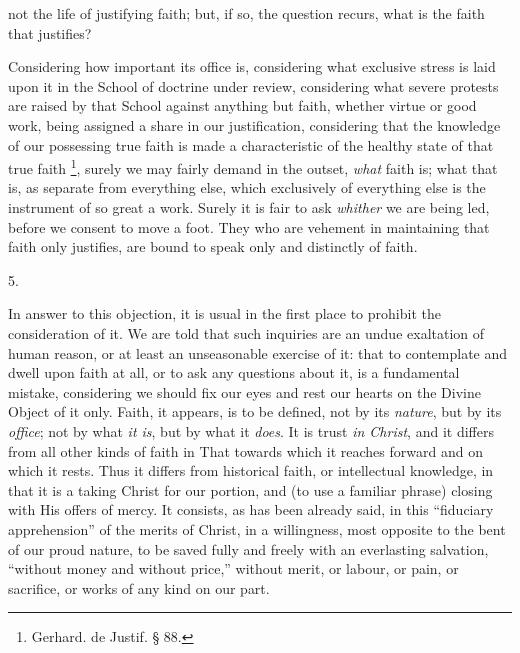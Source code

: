 not the life of justifying faith; but, if so, the question
recurs, what is the faith that justifies?

Considering how important its office is, considering what exclusive
stress is laid upon it in the School of doctrine under review,
considering what severe protests are raised by that School
against anything but faith, whether virtue or good work, being
assigned a share in our justification, considering that the knowledge
of our possessing true faith is made a characteristic of the healthy
state of that true faith \footnote{Gerhard. de
Justif. § 88.}, surely we may fairly demand in the
outset, \emph{what} faith is; what that is, as separate from
everything else, which exclusively of everything else is the
instrument of so great a work. Surely it is fair to ask \emph{whither}
we are being led, before we consent to move a foot. They who are
vehement in maintaining that faith only justifies, are bound to speak
only and distinctly of faith.

5.

In answer to this objection, it is usual in the first place to
prohibit the consideration of it. We are told that such inquiries are
an undue exaltation of human reason, or at least an unseasonable
exercise of it: that to contemplate and dwell upon faith at all, or to
ask any questions about it, is a fundamental mistake, considering we
should fix our eyes and rest our hearts on the Divine Object of it
only. Faith, it appears, is to be defined, not by its \emph{nature},
but by its \emph{office}; not by what \emph{it is}, but by what it \emph{does}.
It is trust \emph{in Christ}, and it differs from all other kinds of
faith in That towards which it reaches forward and on which it rests.
Thus it differs from historical faith, or intellectual knowledge, in
that it is a taking Christ for our portion, and (to use a familiar
phrase) closing with His offers of mercy. It consists, as has been
already said, in this ``fiduciary apprehension'' of the
merits of Christ, in a willingness, most opposite to the bent of our
proud nature, to be saved fully and freely with an everlasting
salvation, ``without money and without price,'' without merit,
or labour, or pain, or sacrifice, or works of any kind on our part.

